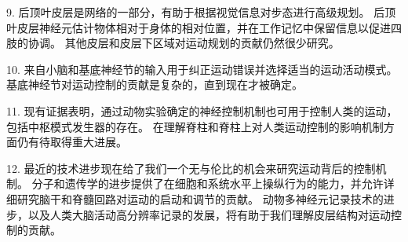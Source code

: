 9. 后顶叶皮层是网络的一部分，有助于根据视觉信息对步态进行高级规划。
后顶叶皮层神经元估计物体相对于身体的相对位置，并在工作记忆中保留信息以促进四肢的协调。
其他皮层和皮层下区域对运动规划的贡献仍然很少研究。


10. 来自小脑和基底神经节的输入用于纠正运动错误并选择适当的运动活动模式。
基底神经节对运动控制的贡献是复杂的，直到现在才被确定。


11. 现有证据表明，通过动物实验确定的神经控制机制也可用于控制人类的运动，包括中枢模式发生器的存在。
在理解脊柱和脊柱上对人类运动控制的影响机制方面仍有待取得重大进展。


12. 最近的技术进步现在给了我们一个无与伦比的机会来研究运动背后的控制机制。
分子和遗传学的进步提供了在细胞和系统水平上操纵行为的能力，并允许详细研究脑干和脊髓回路对运动的启动和调节的贡献。
动物多神经元记录技术的进步，以及人类大脑活动高分辨率记录的发展，将有助于我们理解皮层结构对运动控制的贡献。

